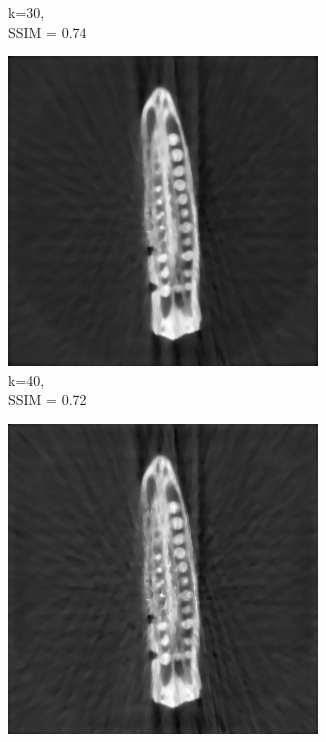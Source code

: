 \documentclass[journal]{IEEEtran}
\begin{document}
\begin{figure}[h]
\begin{subfigure}[b]{0.24\linewidth}
        \caption{k=30,\\ SSIM = 0.74}
     \end{subfigure}
  \begin{subfigure}[b]{0.24\linewidth}
        \includegraphics[width=\textwidth]{../images/okra/post_TCI/2D/48_views/tuning_k/weighted_prior_kk_40_lambda_prior_0.700000.png}
        \caption{k=40,\\ SSIM = 0.72}
     \end{subfigure}
  \begin{subfigure}[b]{0.24\linewidth}
        \includegraphics[width=\textwidth]{../images/okra/post_TCI/2D/48_views/tuning_k/weighted_prior_kk_50_lambda_prior_0.700000.png}

\end{subfigure}
\end{figure}
\end{document}
